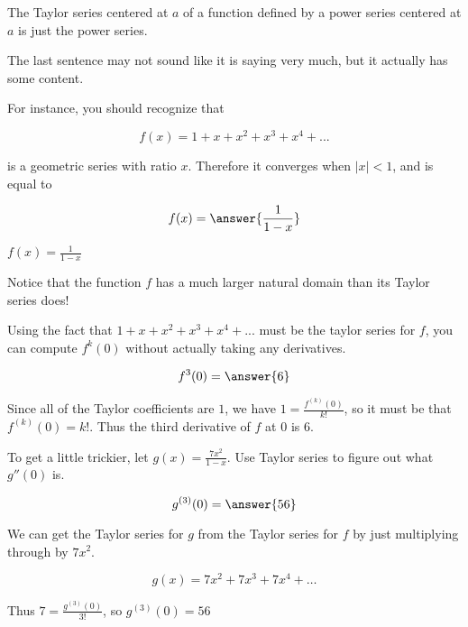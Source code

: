 \documentclass{ximera}
\begin{document}
\begin{example}
	The Taylor series centered at $a$ of a function defined by a power series centered at $a$ is just the power series.
	
	The last sentence may not sound like it is saying very much, but it actually has some content.
	
	\begin{question}

	For instance, you should recognize that
	
	\[
	f(x) = 1+x+x^2+x^3+x^4+...
	\]
	
	is a geometric series with ratio $x$.  Therefore it converges when $|x|<1$, and is equal to 
	
	\[
	f(x) = \answer{\frac{1}{1-x}}
	\]
	
	
	\begin{hint}
		$f(x) = \frac{1}{1-x}$
	\end{hint}	
	
		Notice that the function $f$ has a much larger natural domain than its Taylor series does!

	
	\end{question}
	
	
	Using the fact that $1+x+x^2+x^3+x^4+...$ must be the taylor series for $f$, you can compute $f^k(0)$ without actually taking any derivatives.
	
	\begin{question}
	
	\[
	f^{3}(0) = \answer{6}
	\]
	
	\begin{hint}
		Since all of the Taylor coefficients are $1$, we have $1 = \frac{f^{(k)}(0)}{k!}$, so it must be that $f^{(k)}(0) = k!$.  Thus the third derivative of $f$ at $0$ is $6$.
	\end{hint}
	\end{question}
	
	\begin{question}
	To get a little trickier, let $g(x) = \frac{7x^2}{1-x}$.  Use Taylor series to figure out what $g''(0)$ is.
	
	\[
	g^{(3)}(0) = \answer{56}
	\]
	\end{question}
	
	\begin{hint}
		We can get the Taylor series for $g$ from the Taylor series for $f$ by just multiplying through by $7x^2$.
		
		\[
		g(x) = 7x^2+7x^3+7x^4+\dots
		\]
		
		Thus $7 = \frac{g^{(3)}(0)}{3!}$, so $g^{(3)}(0) = 56$
	\end{hint}
\end{example}
\end{document}

